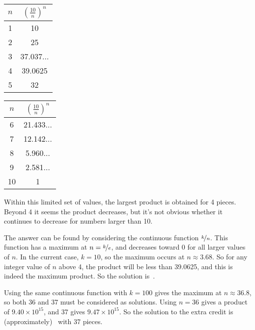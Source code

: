 \documentclass{article}
\begin{document}
\vspace{0.1in}
\begin{center}
\begin{tabular}{cc}
$n$ & $\left(\frac{10}{n}\right)^{n}$ \\
\hline
1 & 10 \\
2 & 25 \\
3 & 37.037$\dots$ \\
4 & 39.0625 \\
5 & 32
\end{tabular}
\qquad\qquad
\begin{tabular}{cc}
$n$ & $\left(\frac{10}{n}\right)^{n}$ \\
\hline
6 & 21.433$\dots$ \\
7 & 12.142$\dots$ \\
8 & 5.960$\dots$ \\
9 & 2.581$\dots$ \\
10 & 1
\end{tabular}
\end{center}
\vspace{0.1in}

Within this limited set of values, the largest product is obtained for 4 pieces.
Beyond 4 it seems the product decreases, but it's not obvious whether it continues to decrease for numbers larger than 10.

The answer can be found by considering the continuous function $\nicefrac{k}{n}$.
This function has a maximum at $n=\nicefrac{k}{e}$, and decreases toward 0 for all larger values of $n$.
In the current case, $k=10$, so the maximum occurs at $n\approx3.68$.
So for any integer value of $n$ above 4, the product will be less than 39.0625, and this is indeed the maximum product.
So the solution is
\,.

Using the same continuous function with $k=100$ gives the maximum at $n\approx36.8$, so both 36 and 37 must be considered as solutions.
Using $n=36$ gives a product of $9.40\times10^{15}$, and 37 gives $9.47\times10^{15}$.
So the solution to the extra credit is (approximately)
\, with 37 pieces.
\end{document}
